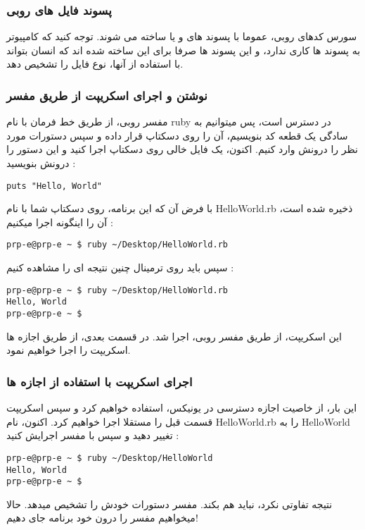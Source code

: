 \documentclass[11pt]{article}
\begin{document}
\subsubsection{پسوند فایل های روبی}
سورس کدهای روبی، عموما با پسوند های  و یا  ساخته می شوند. توجه کنید که کامپیوتر به پسوند ها کاری ندارد، و این پسوند ها صرفا برای این ساخته شده اند که انسان بتواند با استفاده از آنها، نوع فایل را تشخیص دهد. 
\subsubsection{نوشتن و اجرای اسکریپت از طریق مفسر}
مفسر روبی، از طریق خط فرمان با نام ruby در دسترس است، پس میتوانیم به سادگی یک قطعه کد بنویسیم، آن را روی دسکتاپ قرار داده و سپس دستورات مورد نظر را درونش وارد کنیم. اکنون، یک فایل خالی روی دسکتاپ اجرا کنید و این دستور را درونش بنویسید :
\begin{latin}
\begin{verbatim}
puts "Hello, World"
\end{verbatim}
\end{latin}
با فرض آن که این برنامه، روی دسکتاپ شما با نام HelloWorld.rb ذخیره شده است، آن را اینگونه اجرا میکنیم :
\begin{latin}
\begin{verbatim}
prp-e@prp-e ~ $ ruby ~/Desktop/HelloWorld.rb 
\end{verbatim}
\end{latin}
سپس باید روی ترمینال چنین نتیجه ای را مشاهده کنیم :
\begin{latin}
\begin{verbatim}
prp-e@prp-e ~ $ ruby ~/Desktop/HelloWorld.rb 
Hello, World
prp-e@prp-e ~ $ 
\end{verbatim}
\end{latin}
این اسکریپت، از طریق مفسر روبی، اجرا شد. در قسمت بعدی، از طریق اجازه ها
اسکریپت را اجرا خواهیم نمود.
\subsubsection{اجرای اسکریپت با استفاده از اجازه ها}
این بار، از خاصیت اجازه دسترسی در یونیکس، استفاده خواهیم کرد و سپس اسکریپت قسمت قبل را مستقلا اجرا خواهیم کرد. اکنون، نام HelloWorld.rb را به HelloWorld تغییر دهید و سپس با مفسر اجرایش کنید :
\begin{latin}
\begin{verbatim}
prp-e@prp-e ~ $ ruby ~/Desktop/HelloWorld
Hello, World
prp-e@prp-e ~ $ 
\end{verbatim}
\end{latin}
نتیجه تفاوتی نکرد، نباید هم بکند. مفسر دستورات خودش را تشخیص میدهد. حالا میخواهیم مفسر را درون خود برنامه جای دهیم!
\end{document}
